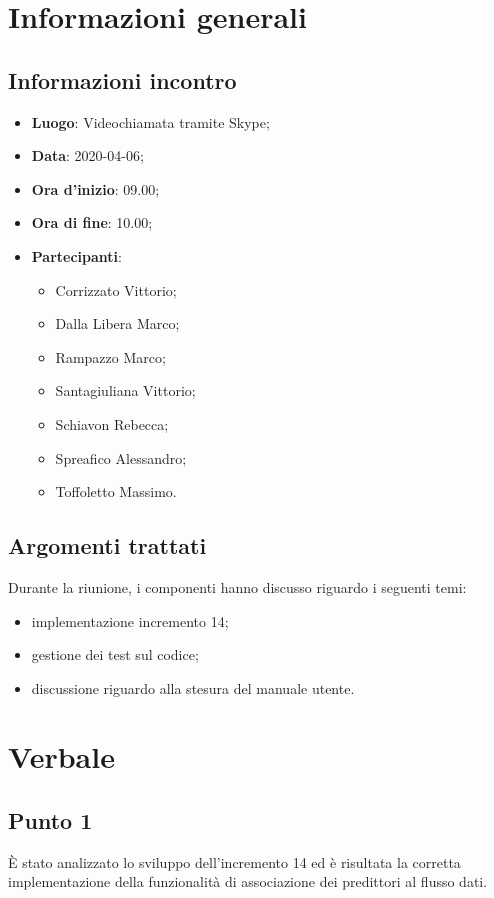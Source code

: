 \section{Informazioni generali}
    \subsection{Informazioni incontro}
        \begin{itemize}
            \item \textbf{Luogo}: Videochiamata tramite Skype;
            \item \textbf{Data}: 2020-04-06;
            \item \textbf{Ora d'inizio}: 09.00;
            \item \textbf{Ora di fine}: 10.00;
            \item \textbf{Partecipanti}: \begin{itemize}
                \item Corrizzato Vittorio;
                \item Dalla Libera Marco;
                \item Rampazzo Marco;
                \item Santagiuliana Vittorio;
                \item Schiavon Rebecca;
                \item Spreafico Alessandro;
                \item Toffoletto Massimo.
            \end{itemize}
        \end{itemize}
    \subsection{Argomenti trattati}
        Durante la riunione, i componenti hanno discusso riguardo i seguenti temi:
        \begin{itemize}
            \item implementazione incremento 14;
            \item gestione dei test sul codice;
            \item discussione riguardo alla stesura del manuale utente.
        \end{itemize}
\section{Verbale}
    \subsection{Punto 1}
        È stato analizzato lo sviluppo dell'incremento 14 ed è risultata la corretta implementazione della funzionalità di associazione dei predittori al flusso dati.

